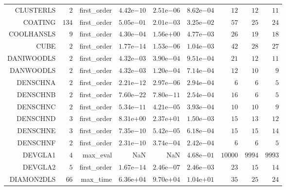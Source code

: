 \begin{longtable}{rrrrrrrrr}
CLUSTERLS & \(     2\) & first\_order & \( 4.42\)e\(-10\) & \( 2.51\)e\(-06\) & \( 8.62\)e\(-04\) & \(    12\) & \(    12\) & \(    11\) \\
COATING & \(   134\) & first\_order & \( 5.05\)e\(-01\) & \( 2.01\)e\(-03\) & \( 3.25\)e\(-02\) & \(    57\) & \(    25\) & \(    24\) \\
COOLHANSLS & \(     9\) & first\_order & \( 4.30\)e\(-04\) & \( 1.56\)e\(+00\) & \( 4.77\)e\(-03\) & \(    26\) & \(    19\) & \(    18\) \\
CUBE & \(     2\) & first\_order & \( 1.77\)e\(-14\) & \( 1.53\)e\(-06\) & \( 1.04\)e\(-03\) & \(    42\) & \(    28\) & \(    27\) \\
DANIWOODLS & \(     2\) & first\_order & \( 4.32\)e\(-03\) & \( 3.90\)e\(-04\) & \( 9.51\)e\(-04\) & \(    21\) & \(    12\) & \(    11\) \\
DANWOODLS & \(     2\) & first\_order & \( 4.32\)e\(-03\) & \( 1.20\)e\(-04\) & \( 7.14\)e\(-04\) & \(    12\) & \(    10\) & \(     9\) \\
DENSCHNA & \(     2\) & first\_order & \( 2.21\)e\(-12\) & \( 2.97\)e\(-06\) & \( 2.94\)e\(-04\) & \(     6\) & \(     6\) & \(     5\) \\
DENSCHNB & \(     2\) & first\_order & \( 7.60\)e\(-22\) & \( 7.80\)e\(-11\) & \( 2.54\)e\(-04\) & \(    16\) & \(     6\) & \(     5\) \\
DENSCHNC & \(     2\) & first\_order & \( 5.34\)e\(-11\) & \( 4.21\)e\(-05\) & \( 3.93\)e\(-04\) & \(    10\) & \(    10\) & \(     9\) \\
DENSCHND & \(     3\) & first\_order & \( 8.31\)e\(+00\) & \( 2.37\)e\(+01\) & \( 1.50\)e\(-03\) & \(    15\) & \(    13\) & \(    12\) \\
DENSCHNE & \(     3\) & first\_order & \( 7.35\)e\(-10\) & \( 5.42\)e\(-05\) & \( 6.18\)e\(-04\) & \(    15\) & \(    15\) & \(    14\) \\
DENSCHNF & \(     2\) & first\_order & \( 2.31\)e\(-10\) & \( 3.74\)e\(-04\) & \( 2.42\)e\(-04\) & \(     6\) & \(     6\) & \(     5\) \\
DEVGLA1 & \(     4\) & max\_eval &       NaN &       NaN & \( 4.68\)e\(-01\) & \( 10000\) & \(  9994\) & \(  9993\) \\
DEVGLA2 & \(     5\) & first\_order & \( 1.67\)e\(-14\) & \( 2.46\)e\(-07\) & \( 2.46\)e\(-03\) & \(    23\) & \(    15\) & \(    14\) \\
DIAMON2DLS & \(    66\) & max\_time & \( 6.36\)e\(+04\) & \( 9.70\)e\(+04\) & \( 1.04\)e\(+01\) & \(    35\) & \(    25\) & \(    24\) \\

\end{longtable}
